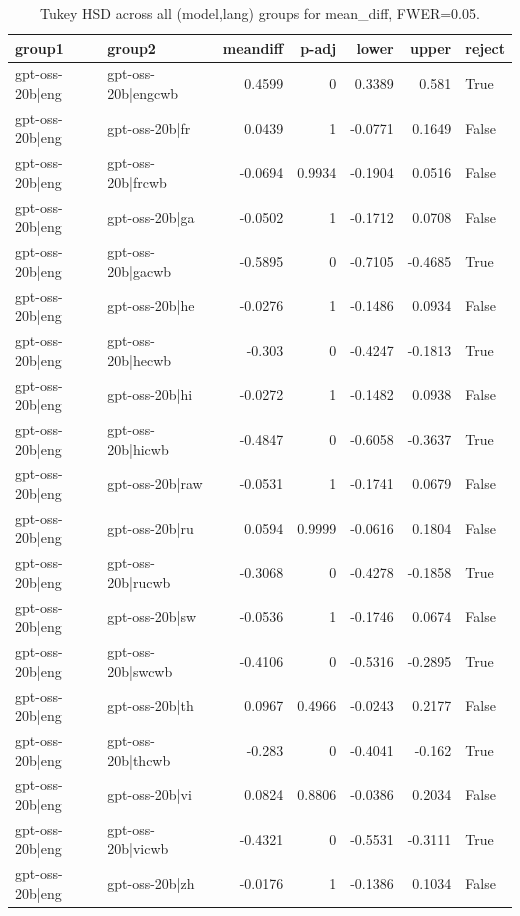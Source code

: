 \begin{table}
\caption{Tukey HSD across all (model,lang) groups for mean_diff, FWER=0.05.}
\label{tab:tukey_all_models_all_langs_mean_diff}
\begin{tabular}{l l r r r r l}
\toprule
group1 & group2 & meandiff & p-adj & lower & upper & reject \\
\midrule
gpt-oss-20b|eng & gpt-oss-20b|engcwb & 0.4599 & 0 & 0.3389 & 0.581 & True \\
gpt-oss-20b|eng & gpt-oss-20b|fr & 0.0439 & 1 & -0.0771 & 0.1649 & False \\
gpt-oss-20b|eng & gpt-oss-20b|frcwb & -0.0694 & 0.9934 & -0.1904 & 0.0516 & False \\
gpt-oss-20b|eng & gpt-oss-20b|ga & -0.0502 & 1 & -0.1712 & 0.0708 & False \\
gpt-oss-20b|eng & gpt-oss-20b|gacwb & -0.5895 & 0 & -0.7105 & -0.4685 & True \\
gpt-oss-20b|eng & gpt-oss-20b|he & -0.0276 & 1 & -0.1486 & 0.0934 & False \\
gpt-oss-20b|eng & gpt-oss-20b|hecwb & -0.303 & 0 & -0.4247 & -0.1813 & True \\
gpt-oss-20b|eng & gpt-oss-20b|hi & -0.0272 & 1 & -0.1482 & 0.0938 & False \\
gpt-oss-20b|eng & gpt-oss-20b|hicwb & -0.4847 & 0 & -0.6058 & -0.3637 & True \\
gpt-oss-20b|eng & gpt-oss-20b|raw & -0.0531 & 1 & -0.1741 & 0.0679 & False \\
gpt-oss-20b|eng & gpt-oss-20b|ru & 0.0594 & 0.9999 & -0.0616 & 0.1804 & False \\
gpt-oss-20b|eng & gpt-oss-20b|rucwb & -0.3068 & 0 & -0.4278 & -0.1858 & True \\
gpt-oss-20b|eng & gpt-oss-20b|sw & -0.0536 & 1 & -0.1746 & 0.0674 & False \\
gpt-oss-20b|eng & gpt-oss-20b|swcwb & -0.4106 & 0 & -0.5316 & -0.2895 & True \\
gpt-oss-20b|eng & gpt-oss-20b|th & 0.0967 & 0.4966 & -0.0243 & 0.2177 & False \\
gpt-oss-20b|eng & gpt-oss-20b|thcwb & -0.283 & 0 & -0.4041 & -0.162 & True \\
gpt-oss-20b|eng & gpt-oss-20b|vi & 0.0824 & 0.8806 & -0.0386 & 0.2034 & False \\
gpt-oss-20b|eng & gpt-oss-20b|vicwb & -0.4321 & 0 & -0.5531 & -0.3111 & True \\
gpt-oss-20b|eng & gpt-oss-20b|zh & -0.0176 & 1 & -0.1386 & 0.1034 & False \\

\end{tabular}
\end{table}
